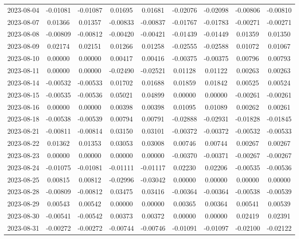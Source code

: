 {\begin{footnotesize}
\begin{longtable}{lcccccccc}
2023-08-04 & -0.01081 & -0.01087 & 0.01695 & 0.01681 & -0.02076 & -0.02098 & -0.00806 & -0.00810 \\
2023-08-07 & 0.01366 & 0.01357 & -0.00833 & -0.00837 & -0.01767 & -0.01783 & -0.00271 & -0.00271 \\
2023-08-08 & -0.00809 & -0.00812 & -0.00420 & -0.00421 & -0.01439 & -0.01449 & 0.01359 & 0.01350 \\
2023-08-09 & 0.02174 & 0.02151 & 0.01266 & 0.01258 & -0.02555 & -0.02588 & 0.01072 & 0.01067 \\
2023-08-10 & 0.00000 & 0.00000 & 0.00417 & 0.00416 & -0.00375 & -0.00375 & 0.00796 & 0.00793 \\
2023-08-11 & 0.00000 & 0.00000 & -0.02490 & -0.02521 & 0.01128 & 0.01122 & 0.00263 & 0.00263 \\
2023-08-14 & -0.00532 & -0.00533 & 0.01702 & 0.01688 & 0.01859 & 0.01842 & 0.00525 & 0.00524 \\
2023-08-15 & -0.00535 & -0.00536 & 0.05021 & 0.04899 & 0.00000 & 0.00000 & -0.00261 & -0.00261 \\
2023-08-16 & 0.00000 & 0.00000 & 0.00398 & 0.00398 & 0.01095 & 0.01089 & 0.00262 & 0.00261 \\
2023-08-18 & -0.00538 & -0.00539 & 0.00794 & 0.00791 & -0.02888 & -0.02931 & -0.01828 & -0.01845 \\
2023-08-21 & -0.00811 & -0.00814 & 0.03150 & 0.03101 & -0.00372 & -0.00372 & -0.00532 & -0.00533 \\
2023-08-22 & 0.01362 & 0.01353 & 0.03053 & 0.03008 & 0.00746 & 0.00744 & 0.00267 & 0.00267 \\
2023-08-23 & 0.00000 & 0.00000 & 0.00000 & 0.00000 & -0.00370 & -0.00371 & -0.00267 & -0.00267 \\
2023-08-24 & -0.01075 & -0.01081 & -0.01111 & -0.01117 & 0.02230 & 0.02206 & -0.00535 & -0.00536 \\
2023-08-25 & 0.00815 & 0.00812 & -0.02996 & -0.03042 & 0.00000 & 0.00000 & 0.00000 & 0.00000 \\
2023-08-28 & -0.00809 & -0.00812 & 0.03475 & 0.03416 & -0.00364 & -0.00364 & -0.00538 & -0.00539 \\
2023-08-29 & 0.00543 & 0.00542 & 0.00000 & 0.00000 & 0.00365 & 0.00364 & 0.00541 & 0.00539 \\
2023-08-30 & -0.00541 & -0.00542 & 0.00373 & 0.00372 & 0.00000 & 0.00000 & 0.02419 & 0.02391 \\
2023-08-31 & -0.00272 & -0.00272 & -0.00744 & -0.00746 & -0.01091 & -0.01097 & -0.02100 & -0.02122 \\

\end{longtable}
\end{footnotesize}}
